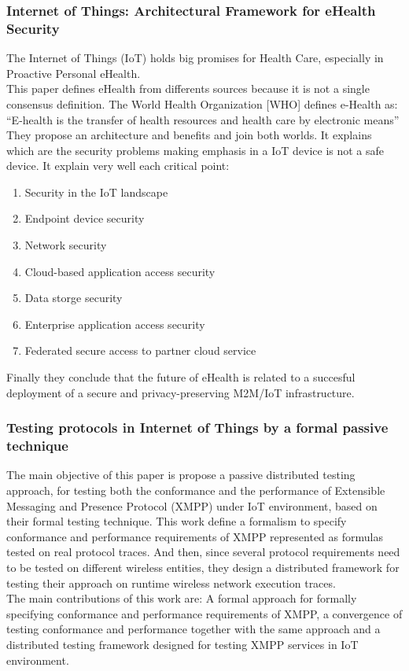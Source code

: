 \subsubsection{Internet of Things: Architectural Framework	for eHealth Security}\cite{Paper8}
The Internet of Things (IoT) holds big promises for Health Care, especially in Proactive Personal eHealth.\\
This paper defines eHealth from differents sources because it is not a single consensus definition. The World Health Organization [WHO] defines e-Health as:\\
``E-health is the transfer of health resources and health care by electronic means''\\
They propose an architecture and benefits and join both worlds. It explains which are the security problems making emphasis in a IoT device is not a safe device. It explain very well each critical point:
\begin{enumerate}
	\item Security in the IoT landscape
	\item Endpoint device security
	\item Network security
	\item Cloud-based application access security
	\item Data storge security
	\item Enterprise application access security
	\item Federated secure access to partner cloud service
\end{enumerate}

Finally they conclude that the future of eHealth is related to a succesful deployment of a secure and privacy-preserving M2M/IoT infrastructure. 

\subsubsection{Testing protocols in Internet of Things by a formal passive technique}\cite{Paper11}
The main objective of this paper is propose a passive distributed testing approach, for testing both the conformance and the performance of Extensible Messaging and Presence Protocol (XMPP) under IoT environment, based on their formal testing technique. This work define a formalism to specify conformance and performance requirements of XMPP represented as formulas tested on real protocol traces. And then, since several protocol requirements need to be tested on different wireless entities, they design a distributed framework for testing their approach on runtime wireless network execution traces.\\
The main contributions of this work are: A formal approach for formally specifying conformance and performance requirements of XMPP, a convergence of testing conformance and performance together with the same approach and a distributed testing framework designed for testing XMPP services in IoT environment.

